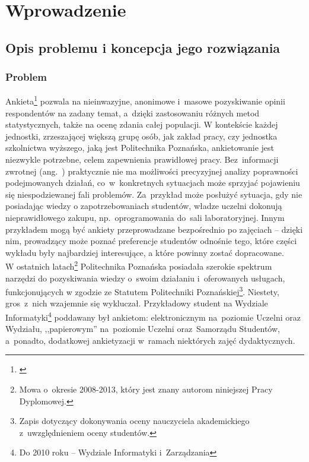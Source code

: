 \chapter{Wprowadzenie}
\label{Chapter1}

\section{Opis problemu i koncepcja jego rozwiązania}
\label{Chapter11}

\subsection{Problem}
\label{Chapter111}

Ankieta\footnote{\cite{Wiki:BA}\cite{IP:Awbi}} pozwala na nieinwazyjne, anonimowe i~masowe pozyskiwanie opinii respondentów na zadany temat, a~dzięki zastosowaniu różnych metod statystycznych, także na ocenę zdania całej populacji. W kontekście każdej jednostki, zrzeszającej większą grupę osób, jak zakład pracy, czy jednostka szkolnictwa wyższego, jaką jest Politechnika Poznańska, ankietowanie jest niezwykle potrzebne, celem zapewnienia prawidłowej pracy. Bez~informacji zwrotnej (ang.~) praktycznie nie ma możliwości precyzyjnej analizy poprawności podejmowanych działań, co~w~konkretnych sytuacjach może sprzyjać pojawieniu się niespodziewanej fali problemów. Za~przykład może posłużyć sytuacja, gdy nie posiadając wiedzy o zapotrzebowaniach studentów, władze uczelni dokonują nieprawidłowego zakupu, np.~oprogramowania do~sali laboratoryjnej. Innym przykładem mogą być ankiety przeprowadzane bezpośrednio po zajęciach -- dzięki nim, prowadzący może poznać preferencje studentów odnośnie tego, które części wykładu były najbardziej interesujące, a które powinny zostać dopracowane. \\

W ostatnich latach\footnote{Mowa o~okresie 2008-2013, który jest znany autorom niniejszej Pracy Dyplomowej.} Politechnika Poznańska posiadała szerokie spektrum narzędzi do pozyskiwania wiedzy o~swoim działaniu i~oferowanych usługach, funkcjonujących w zgodzie ze Statutem Politechniki Poznańskiej\footnote{Zapis dotyczący dokonywania oceny nauczyciela akademickiego z~uwzględnieniem oceny studentów\cite{AP:SPP11}.}. Niestety, gros~z~nich wzajemnie się wykluczał. Przykładowy student na Wydziale Informatyki\footnote{Do 2010 roku -- Wydziale Informatyki i~Zarządzania} poddawany był ankietom: elektronicznym na~poziomie Uczelni oraz Wydziału, ,,papierowym'' na~poziomie Uczelni oraz~Samorządu Studentów, a~ponadto, dodatkowej ankietyzacji w~ramach niektórych zajęć dydaktycznych. \\

